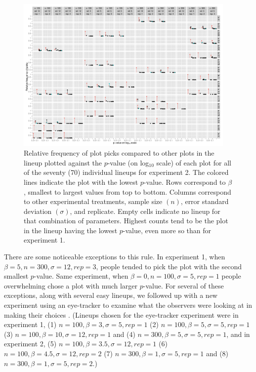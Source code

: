 \documentclass{article}
\begin{document}
\begin{figure}[hbtp]
   \centering
       \includegraphics[width=0.95\textwidth]{p_val_log_counts2.pdf}
       \caption{Relative frequency of plot picks compared to other plots in the lineup plotted against the $p$-value (on log$_{10}$ scale) of each plot for all of the seventy (70) individual lineups for experiment 2. The colored lines indicate the plot with the lowest $p$-value. Rows correspond to $\beta$, smallest to largest values from top to bottom. Columns correspond to other experimental treatments, sample size $(n)$, error standard deviation $(\sigma)$, and replicate. Empty cells indicate no lineup for that combination of parameters. Highest counts tend to be the plot in the lineup having the lowest $p$-value, even more so than for experiment 1.}
       \label{fig:P-val_log2}
\end{figure}


There are some noticeable exceptions to this rule. In experiment 1, when $\beta=5, n=300, \sigma=12, rep=3$, people tended to pick the plot with the second smallest $p$-value.  Same experiment, when $\beta=0, n=100, \sigma=5, rep=1$ people overwhelming chose a plot with much larger $p$-value. For several of these exceptions, along with several easy lineups, we followed up with a new experiment using an eye-tracker to examine what the observers were looking at in making their choices \citep{zhao:2012}.
(Lineups chosen for the eye-tracker experiment were in experiment 1, (1) $n=100, \beta=3, \sigma=5, rep=1$ (2) $n=100, \beta=5, \sigma=5, rep=1$ (3) $n=100, \beta=10, \sigma=12, rep=1$ and (4) $n=300, \beta=5, \sigma=5, rep=1$, and in experiment 2, (5) $n=100, \beta=3.5, \sigma=12, rep=1$ (6) $n=100, \beta=4.5, \sigma=12, rep=2$ (7) $n=300, \beta=1, \sigma=5, rep=1$ and (8) $n=300, \beta=1, \sigma=5, rep=2$.)
\end{document}
